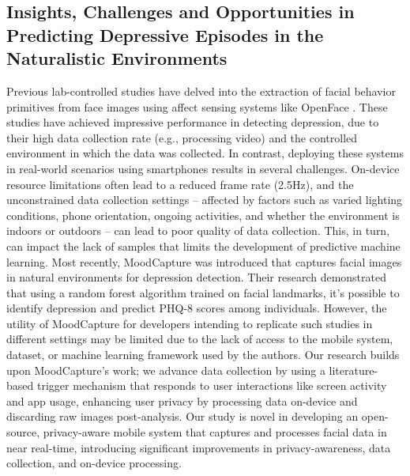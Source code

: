 \subsection{Insights, Challenges and Opportunities in Predicting Depressive Episodes in the Naturalistic Environments}
Previous lab-controlled studies have delved into the extraction of facial behavior primitives from face images using affect sensing systems like OpenFace \cite{baltrusaitis2018openface}. These studies \cite{cohn2009detecting, valstar2013avec, song2020spectral, kong2022automatic, casado2023depression} have achieved impressive performance in detecting depression, due to their high data collection rate (e.g., processing video) and the controlled environment in which the data was collected. In contrast, deploying these systems in real-world scenarios using smartphones results in several challenges. On-device resource limitations often lead to a reduced frame rate (2.5Hz), and the unconstrained data collection settings -- affected by factors such as varied lighting conditions, phone orientation, ongoing activities, and whether the environment is indoors or outdoors -- can lead to poor quality of data collection. This, in turn, can impact the lack of samples that limits the development of predictive machine learning. Most recently, MoodCapture \cite{nepal2024moodcapture} was introduced that captures facial images in natural environments for depression detection. Their research demonstrated that using a random forest algorithm trained on facial landmarks, it's possible to identify depression and predict PHQ-8 scores among individuals. However, the utility of MoodCapture for developers intending to replicate such studies in different settings may be limited due to the lack of access to the mobile system, dataset, or machine learning framework used by the authors. Our research builds upon MoodCapture's work; we advance data collection by using a literature-based trigger mechanism that responds to user interactions like screen activity and app usage, enhancing user privacy by processing data on-device and discarding raw images post-analysis. Our study is novel in developing an open-source, privacy-aware mobile system that captures and processes facial data in near real-time, introducing significant improvements in privacy-awareness, data collection, and on-device processing.

